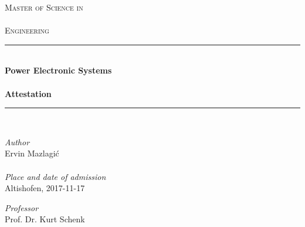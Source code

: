 \thispagestyle{empty}
\begin{titlepage}

\begin{center}

\textsc{
	\LARGE Master of Science in\\~\\Engineering}\\[1.5cm]
\vfill{}
\newcommand{\HRule}{\rule{\linewidth}{0.5mm}}
\HRule
\\[0.4cm]
{
	\Huge \bfseries Power Electronic Systems \\
        ~\\
        \large Attestation}
\\[0.4cm]
\HRule
\\[0.5cm]

	\large 

\vfill{}

\begin{minipage}{0.4\textwidth}
    \begin{flushleft} \large
	\emph{Author}\\
        Ervin Mazlagi\'c\\ ~ \\
	\emph{Place and date of admission}\\
	Altishofen, 2017-11-17
    \end{flushleft}
\end{minipage}
\hfill
\begin{minipage}{0.4\textwidth}
    \begin{flushright} \large
        \emph{Professor} \\
        Prof. Dr. Kurt Schenk \\ ~ \\
    \end{flushright}
\end{minipage}

\end{center}

\end{titlepage}
